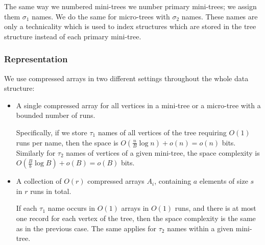 The same way we numbered mini-trees we number primary mini-trees; we assign them $\sigma_1$ names.
We do the same for micro-trees with $\sigma_2$ names.
These names are only a technicality which is used to index structures which are stored in the tree structure instead of each primary mini-tree.

\subsubsection{Representation}

We use compressed arrays in two different settings throughout the whole data structure:
\begin{itemize}
	\item A single compressed array for all vertices in a mini-tree or a micro-tree with a bounded number of runs.
	
	Specifically, if we store $\tau_1$ names of all vertices of the tree requiring $O(1)$ runs per name, then the space is $O(\frac{n}{B} \log n) + o(n) = o(n)$ bits.
	Similarly for $\tau_2$ names of vertices of a given mini-tree, the space complexity is $O(\frac{B}{b} \log B) + o(B) = o(B)$ bits.
	
	\item A collection of $O(r)$ compressed arrays $A_i$, containing $a$ elements of size $s$ in $r$ runs in total.
	
	If each $\tau_1$ name occurs in $O(1)$ arrays in $O(1)$ runs, and there is at most one record for each vertex of the tree, then the space complexity is the same as in the previous case.
	The same applies for $\tau_2$ names within a given mini-tree.
\end{itemize}

